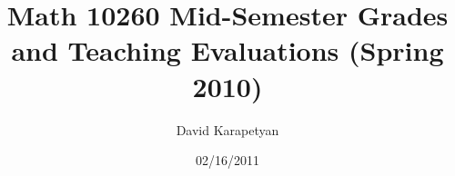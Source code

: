 \documentclass[12pt]{amsart}
\begin{document}
\title{Math 10260 Mid-Semester Grades and Teaching Evaluations (Spring 2010)}
\author{David Karapetyan}
				  \date{02/16/2011}
				  \maketitle
\end{document}
